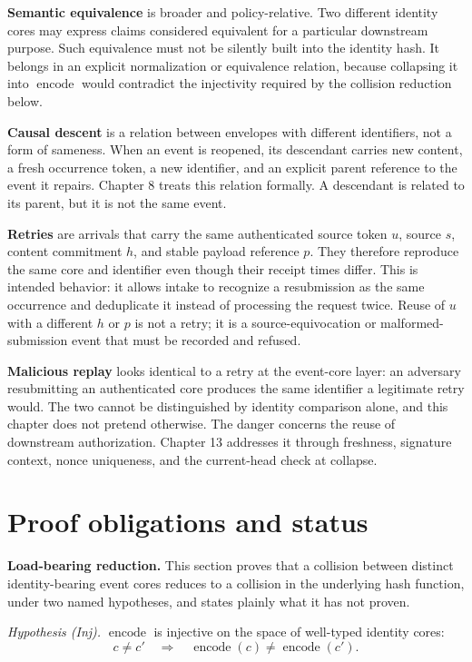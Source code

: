 \documentclass[11pt,openany]{book}
\begin{document}
\textbf{Semantic equivalence} is broader and policy-relative. Two different
identity cores may express claims considered equivalent for a particular
downstream purpose. Such equivalence must not be silently built into the
identity hash. It belongs in an explicit normalization or equivalence relation,
because collapsing it into \(\operatorname{encode}\) would contradict the
injectivity required by the collision reduction below.

\textbf{Causal descent} is a relation between envelopes with different
identifiers, not a form of sameness. When an event is reopened, its descendant
carries new content, a fresh occurrence token, a new identifier, and an
explicit parent reference to the event it repairs. Chapter 8 treats this
relation formally. A descendant is related to its parent, but it is not the
same event.

\textbf{Retries} are arrivals that carry the same authenticated source token
\(u\), source \(s\), content commitment \(h\), and stable payload reference
\(p\). They therefore reproduce the same core and identifier even though their
receipt times differ. This is intended behavior: it allows intake to recognize
a resubmission as the same occurrence and deduplicate it instead of processing
the request twice. Reuse of \(u\) with a different \(h\) or \(p\) is not a
retry; it is a source-equivocation or malformed-submission event that must be
recorded and refused.

\textbf{Malicious replay} looks identical to a retry at the event-core layer:
an adversary resubmitting an authenticated core produces the same identifier a
legitimate retry would. The two cannot be distinguished by identity comparison
alone, and this chapter does not pretend otherwise. The danger concerns the
reuse of downstream authorization. Chapter 13 addresses it through freshness,
signature context, nonce uniqueness, and the current-head check at collapse.

\section{Proof obligations and status}

\textbf{Load-bearing reduction.} This section proves that a collision between
distinct identity-bearing event cores reduces to a collision in the underlying
hash function, under two named hypotheses, and states plainly what it has not
proven.

\textit{Hypothesis (Inj).} \(\operatorname{encode}\) is injective on the space
of well-typed identity cores:
\[
  c\neq c'\quad\Longrightarrow\quad
  \operatorname{encode}(c)\neq\operatorname{encode}(c').
\]
\end{document}
